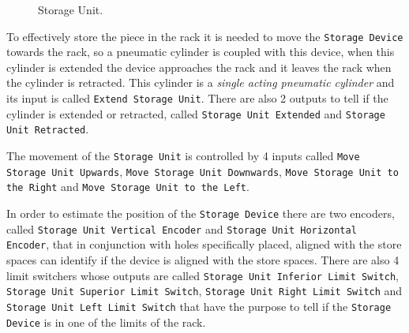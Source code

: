\begin{figure}[H]
  \centering
  \caption{Storage Unit.}
  \label{fig:storageUnit}
\end{figure}
To effectively store the piece in the rack it is needed to move the
\verb|Storage Device| towards the rack, so a pneumatic cylinder is coupled with
this device, when this cylinder is extended the device approaches the rack and
it leaves the rack when the cylinder is retracted. This cylinder is a
\emph{single acting pneumatic cylinder} and its input is called
\verb|Extend Storage Unit|. There are also 2 outputs to tell if the cylinder is
extended or retracted, called \verb|Storage Unit Extended| and
\verb|Storage Unit Retracted|.

The movement of the \verb|Storage Unit| is controlled by 4 inputs called
\verb|Move Storage Unit Upwards|, \verb|Move Storage Unit Downwards|,
\verb|Move Storage Unit to the Right| and
\verb|Move Storage Unit to the Left|.

In order to estimate the position of the \verb|Storage Device|  there are two
encoders, called \verb|Storage Unit Vertical Encoder| and
\verb|Storage Unit Horizontal Encoder|, that in conjunction with holes
specifically placed, aligned with the store spaces can identify if the device is
aligned with the store spaces. There are also 4 limit switchers  whose outputs
are called
\verb|Storage Unit Inferior Limit Switch|,
\verb|Storage Unit Superior Limit Switch|,
\verb|Storage Unit Right Limit Switch| and
\verb|Storage Unit Left Limit Switch| that have the purpose to tell if the
\verb|Storage Device| is in one of the limits of the rack.


